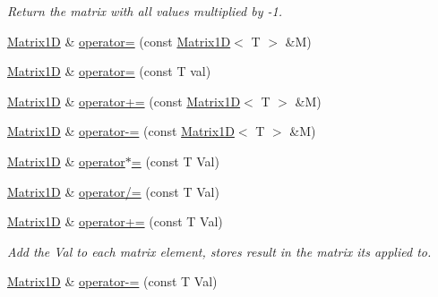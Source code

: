 \begin{DoxyCompactItemize}
\begin{DoxyCompactList}\small\item\em Return the matrix with all values multiplied by -\/1. \end{DoxyCompactList}\item 
\hyperlink{class_matrix1_d}{Matrix1\+D} \& \hyperlink{class_matrix1_d_af959e09f52234f6c4f0f49296723bc3f}{operator=} (const \hyperlink{class_matrix1_d}{Matrix1\+D}$<$ T $>$ \&M)
\item 
\hyperlink{class_matrix1_d}{Matrix1\+D} \& \hyperlink{class_matrix1_d_a64936f82364e4b78aab06bcd68bbf03c}{operator=} (const T val)
\item 
\hyperlink{class_matrix1_d}{Matrix1\+D} \& \hyperlink{class_matrix1_d_ae780f3426aeb90adc437155565242913}{operator+=} (const \hyperlink{class_matrix1_d}{Matrix1\+D}$<$ T $>$ \&M)
\item 
\hyperlink{class_matrix1_d}{Matrix1\+D} \& \hyperlink{class_matrix1_d_a7d806ffca0f5856f5c39600d91cc8beb}{operator-\/=} (const \hyperlink{class_matrix1_d}{Matrix1\+D}$<$ T $>$ \&M)
\item 
\hyperlink{class_matrix1_d}{Matrix1\+D} \& \hyperlink{class_matrix1_d_a4626db7e693afa34c40fbf360667ac33}{operator$\ast$=} (const T Val)
\item 
\hyperlink{class_matrix1_d}{Matrix1\+D} \& \hyperlink{class_matrix1_d_ab9ad4c417c2a1a276ba007afd2f5cc1e}{operator/=} (const T Val)
\item 
\hypertarget{class_matrix1_d_adb8d06ada4214b1693cedfcc2a95861f}{}\hyperlink{class_matrix1_d}{Matrix1\+D} \& \hyperlink{class_matrix1_d_adb8d06ada4214b1693cedfcc2a95861f}{operator+=} (const T Val)\label{class_matrix1_d_adb8d06ada4214b1693cedfcc2a95861f}

\begin{DoxyCompactList}\small\item\em Add the Val to each matrix element, stores result in the matrix it\textquotesingle{}s applied to. \end{DoxyCompactList}\item 
\hypertarget{class_matrix1_d_a2fb0937c7814c8a90f43ed89e81c4068}{}\hyperlink{class_matrix1_d}{Matrix1\+D} \& \hyperlink{class_matrix1_d_a2fb0937c7814c8a90f43ed89e81c4068}{operator-\/=} (const T Val)\label{class_matrix1_d_a2fb0937c7814c8a90f43ed89e81c4068}


\end{DoxyCompactItemize}
